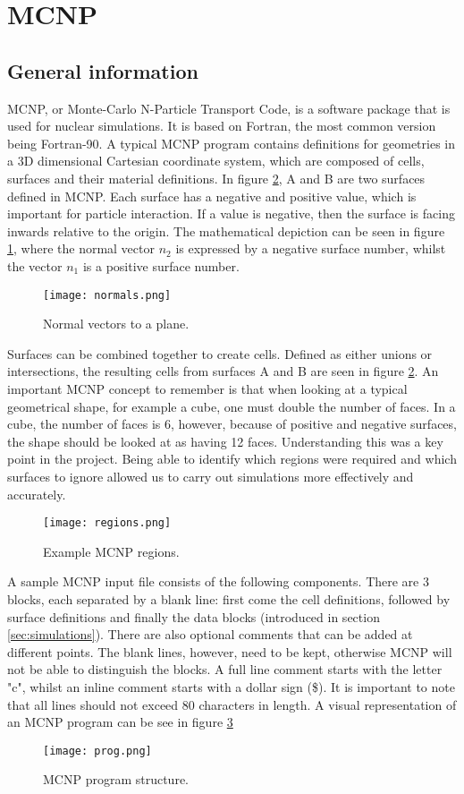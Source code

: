 \label{sec:mcnp}
\section{MCNP}
\subsection{General information}
MCNP, or Monte-Carlo N-Particle Transport Code, is a software package that is used for nuclear simulations. It is based on Fortran, the most common version being Fortran-90. A typical MCNP program contains definitions for geometries in a 3D dimensional Cartesian coordinate system, which are composed of cells, surfaces and their material definitions. In figure \ref{fig:regions}, A and B are two surfaces defined in MCNP. Each surface has a negative and positive value, which is important for particle interaction. If a value is negative, then the surface is facing inwards relative to the origin. The mathematical depiction can be seen in figure \ref{fig:planes}, where the normal vector $n_2$ is expressed by a negative surface number, whilst the vector $n_1$ is a positive surface number.
\begin{figure}[!htbp]
\caption{Normal vectors to a plane.}
\label{fig:planes}
\centering
\texttt{[image: normals.png]}
\end{figure}
Surfaces can be combined together to create cells. Defined as either unions or intersections, the resulting cells from surfaces A and B are seen in figure \ref{fig:regions}. An important MCNP concept to remember is that when looking at a typical geometrical shape, for example a cube, one must double the number of faces. In a cube, the number of faces is 6, however, because of positive and negative surfaces, the shape should be looked at as having 12 faces. Understanding this was a key point in the project. Being able to identify which regions were required and which surfaces to ignore allowed us to carry out simulations more effectively and accurately.
\begin{figure}[!htbp]
\caption{Example MCNP regions.}
\label{fig:regions}
\centering
\texttt{[image: regions.png]}
\end{figure}
A sample MCNP input file consists of the following components. There are 3 blocks, each separated by a blank line: first come the cell definitions, followed by surface definitions and finally the data blocks (introduced in section \ref{sec:simulations}). There are also optional comments that can be added at different points. The blank lines, however, need to be kept, otherwise MCNP will not be able to distinguish the blocks. A full line comment starts with the letter "c", whilst an inline comment starts with a dollar sign (\$). It is important to note that all lines should not exceed 80 characters in length. A visual representation of an MCNP program can be see in figure \ref{fig:program}
\begin{figure}[!htbp]
\caption{MCNP program structure.}
\label{fig:program}
\centering
\texttt{[image: prog.png]}
\end{figure}
